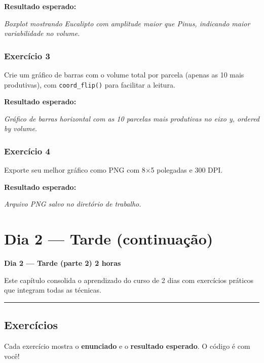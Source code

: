 \documentclass[
  letterpaper,
]{scrbook}
\begin{document}
\textbf{Resultado esperado:}

\emph{Boxplot mostrando Eucalipto com amplitude maior que Pinus,
indicando maior variabilidade no volume.}

\subsection{Exercício 3}\label{exercuxedcio-3-5}

Crie um gráfico de barras com o volume total por parcela (apenas as 10
mais produtivas), com \texttt{coord\_flip()} para facilitar a leitura.

\textbf{Resultado esperado:}

\emph{Gráfico de barras horizontal com as 10 parcelas mais produtivas no
eixo y, ordered by volume.}

\subsection{Exercício 4}\label{exercuxedcio-4-2}

Exporte seu melhor gráfico como PNG com 8×5 polegadas e 300 DPI.

\textbf{Resultado esperado:}

\emph{Arquivo PNG salvo no diretório de trabalho.}

\chapter{Dia 2 --- Tarde
(continuação)}\label{dia-2-tarde-continuauxe7uxe3o}

\textbf{Dia 2 --- Tarde (parte 2) \textbar{} 2 horas}

Este capítulo consolida o aprendizado do curso de 2 dias com exercícios
práticos que integram todas as técnicas.

\begin{center}\rule{0.5\linewidth}{0.5pt}\end{center}

\section{Exercícios}\label{exercuxedcios-7}

\begin{tcolorbox}[enhanced jigsaw, arc=.35mm, bottomrule=.15mm, bottomtitle=1mm, breakable, colback=white, colbacktitle=quarto-callout-note-color!10!white, colframe=quarto-callout-note-color-frame, coltitle=black, left=2mm, leftrule=.75mm, opacityback=0, opacitybacktitle=0.6, rightrule=.15mm, title=\textcolor{quarto-callout-note-color}{\faInfo}\hspace{0.5em}{Como fazer os exercícios}, titlerule=0mm, toprule=.15mm, toptitle=1mm]

Cada exercício mostra o \textbf{enunciado} e o \textbf{resultado
esperado}. O código é com você!

\end{tcolorbox}
\end{document}
